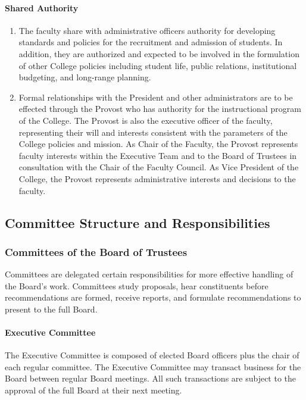 \documentclass[letterpaper, 11pt]{article}
\newcommand{\note}[2]{\setlength{\fboxrule}{#2}\fbox{\parbox{\columnwidth}{#1}}}
\newcommand{\donNote}[1]{\note{#1 \hfill {\bfseries djp3}}{0.9mm}}
\begin{document}
			\paragraph{Shared Authority}
				\begin{enumerate}
					\item{ The faculty share with administrative officers authority for developing standards and policies
						for the recruitment and admission of students. In addition, they are authorized and expected to be
						involved in the formulation of other College policies including student life, public relations,
						institutional budgeting, and long-range planning.}
					\item{ Formal relationships with the President and other administrators are to be effected through the
						Provost who has authority for the instructional program of the College.  The Provost is also the
						executive officer of the faculty, representing their will and interests consistent with the
						parameters of the College policies and mission.  As Chair of the Faculty, the Provost represents
						faculty interests within the Executive Team and to the Board of Trustees in consultation with the
						Chair of the Faculty Council.  As Vice President of the College, the Provost represents
						administrative interests and decisions to the faculty.}
				\end{enumerate}
				\donNote{Copyedit stopped here}
	\subsection{Committee Structure and Responsibilities}
		\subsubsection{Committees of the Board of Trustees}
			Committees are delegated certain responsibilities for more effective handling of the Board's work.  Committees study proposals, hear constituents before recommendations are formed, receive reports, and formulate recommendations to present to the full Board.
			\paragraph{Executive Committee}
				The Executive Committee is composed of elected Board officers plus the chair of each regular committee.  The Executive Committee may transact business for the Board between regular Board meetings.  All such transactions are subject to the approval of the full Board at their next meeting.
\end{document}
